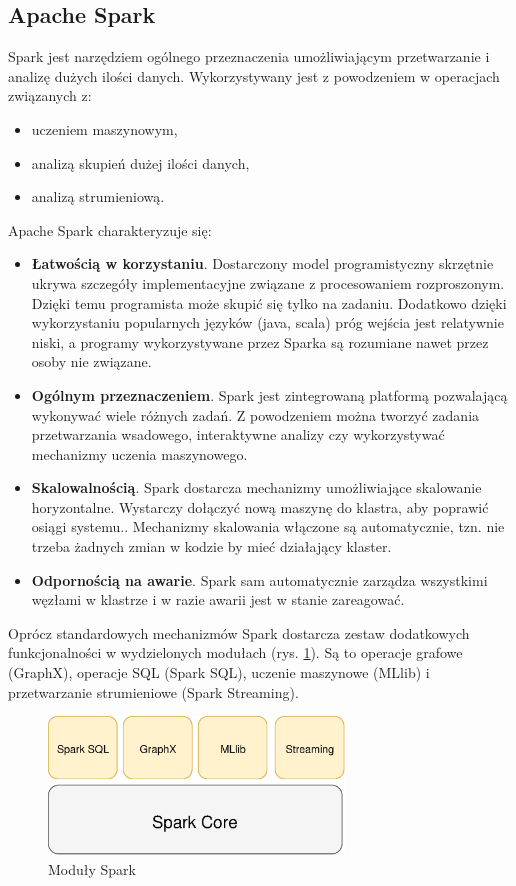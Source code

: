 \subsection{Apache Spark}
Spark jest narzędziem ogólnego przeznaczenia umożliwiającym przetwarzanie
i analizę dużych ilości danych.
Wykorzystywany jest z powodzeniem w operacjach związanych z:
\begin{itemize}
  \item uczeniem maszynowym,
  \item analizą skupień dużej ilości danych,
  \item analizą strumieniową.
\end{itemize}
Apache Spark charakteryzuje się:
\begin{itemize}
  \item \textbf{Łatwością w korzystaniu}.
  Dostarczony model programistyczny skrzętnie ukrywa szczegóły implementacyjne związane z procesowaniem rozproszonym.
  Dzięki temu programista może skupić się tylko na zadaniu.
  Dodatkowo dzięki wykorzystaniu popularnych języków (java, scala) próg wejścia jest relatywnie niski,
  a programy wykorzystywane przez Sparka są rozumiane nawet przez osoby nie związane.
  \item \textbf{Ogólnym przeznaczeniem}.
  Spark jest zintegrowaną platformą pozwalającą wykonywać wiele różnych zadań.
  Z powodzeniem można tworzyć zadania przetwarzania wsadowego,
  interaktywne analizy czy wykorzystywać mechanizmy uczenia maszynowego.
  \item \textbf{Skalowalnością}.
  Spark dostarcza mechanizmy umożliwiające skalowanie horyzontalne.
  Wystarczy dołączyć nową maszynę do klastra, aby poprawić osiągi systemu..
  Mechanizmy skalowania włączone są automatycznie,
  tzn. nie trzeba żadnych zmian w kodzie by mieć działający klaster.
  \item \textbf{Odpornością na awarie}.
  Spark sam automatycznie zarządza wszystkimi węzłami w klastrze
  i w razie awarii jest w stanie zareagować.
\end{itemize}

Oprócz standardowych mechanizmów Spark dostarcza zestaw dodatkowych funkcjonalności
w wydzielonych modułach (rys. \ref{fig:SparkModules}).
Są to operacje grafowe (GraphX), operacje SQL (Spark SQL), uczenie maszynowe (MLlib)
i przetwarzanie strumieniowe (Spark Streaming).
\begin{figure}[htbp]
  \centering
  \includegraphics[width=0.7\textwidth]{img/sparkModules}
  \caption{Moduły Spark}
  \label{fig:SparkModules}
\end{figure}
